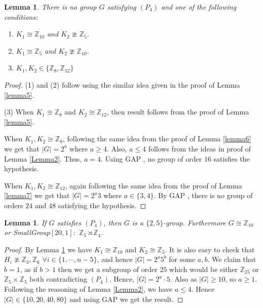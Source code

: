 \documentclass[a4paper,11pt]{amsart}
\numberwithin{equation}{section}
\numberwithin{equation}{subsection}
\newtheorem{lemma}[theorem]{Lemma}
\begin{document}
 \begin{lemma}\label{lemma8}
     There is no group $G$ satisfying $(P_4)$ and one of the following conditions:
   \begin{enumerate}
\item $K_1\cong \mathbb{Z}_{10}$ and $K_2 \ncong \mathbb Z_{5}$.
\item  $K_1 \cong \mathbb Z_{5}$ and  $K_2 \ncong \mathbb Z_{10}$.


        \item $K_1,K_2\in \{\mathbb{Z}_{8},\mathbb{Z}_{12}\}$


   \end{enumerate}
 \end{lemma}
\begin{proof}
   (1) and (2) follow using the similar idea given in the proof of Lemma \ref{lemma5}.

    (3) When $K_1\cong \mathbb{Z}_{8}$ and $K_2\cong \mathbb{Z}_{12}$, then result follows from the proof of Lemma \ref{lemma5}.
    
    When $K_1,K_2\cong \mathbb{Z}_8$, following the same idea from the proof of Lemma \ref{lemma6} we get that $|G| = 2^{a}$ where $a\geq 4$.  Also, $a\leq 4$ follows from the ideas in proof of Lemma \ref{Lemma2}. Thus, $a=4$. Using GAP \cite{GAP}, no group of order $16$ satisfies the hypothesis.  
    
    When $K_1,K_2\cong \mathbb{Z}_{12}$, again following the same idea from the proof of Lemma \ref{lemma7} we get that $|G| = 2^{a}3$ where $a\in \{3,4\}$. By GAP \cite{GAP}, there is no group of orders $24$ and $48$ satisfying the hypothesis.
\end{proof}
 
\begin{lemma}\label{lemma9}
    If $G$ satisfies $(P_4)$, then $G$ is a $\{2,5\}$-group. Furthermore $G \cong \mathbb Z_{10}$ or SmallGroup$[20,1]:$ $\mathbb{Z}_{5}\rtimes \mathbb{Z}_{4}$.
\end{lemma}
\begin{proof} 
By Lemma \ref{lemma8} we have $K_1\cong \mathbb{Z}_{10}$ and $K_2 \cong \mathbb Z_{5}$.
    It is also easy to check that $H_{i}\ncong \mathbb{Z}_{3},\mathbb{Z}_6$ $\forall i \in \{1,\cdots, n-5\}$, and hence $|G|=2^{a}5^{b}$ for some $a,b$. We claim that $b=1$, as if $b>1$ then we get a subgroup of order $25$ which would be either $\mathbb{Z}_{25}$ or $\mathbb{Z}_5\times \mathbb{Z}_5$ both contradicting $(P_4)$. Hence, $|G| = 2^a \cdot 5$. Also as $|G|\geq 10$, so $a\geq 1$. Following the reasoning of Lemma \ref{Lemma2}, we have $a\leq 4$. Hence $|G|\in \{10,20,40,80\}$ and using GAP \cite{GAP} we get the result.
\end{proof}
\end{document}
